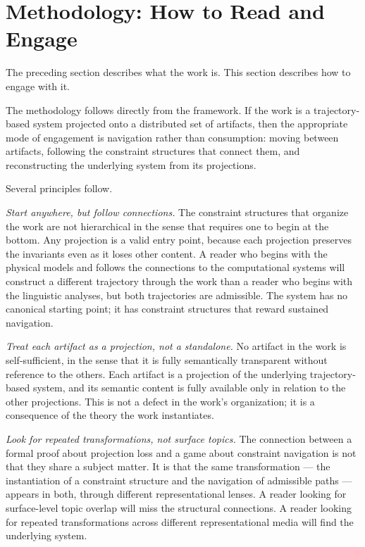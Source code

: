\documentclass[12pt, twoside]{article}
\theoremstyle{plain}
\theoremstyle{definition}
\theoremstyle{remark}
\begin{document}
\section{Methodology: How to Read and Engage}

The preceding section describes what the work is.
This section describes how to engage with it.

The methodology follows directly from the framework.
If the work is a trajectory-based system projected onto
a distributed set of artifacts, then the appropriate mode
of engagement is navigation rather than consumption:
moving between artifacts, following the constraint structures
that connect them, and reconstructing the underlying system
from its projections.

Several principles follow.

\textit{Start anywhere, but follow connections.}
The constraint structures that organize the work are not hierarchical
in the sense that requires one to begin at the bottom.
Any projection is a valid entry point, because each projection
preserves the invariants even as it loses other content.
A reader who begins with the physical models and follows the
connections to the computational systems will construct a different
trajectory through the work than a reader who begins with the
linguistic analyses, but both trajectories are admissible.
The system has no canonical starting point; it has constraint
structures that reward sustained navigation.

\textit{Treat each artifact as a projection, not a standalone.}
No artifact in the work is self-sufficient, in the sense
that it is fully semantically transparent without reference
to the others.
Each artifact is a projection of the underlying trajectory-based
system, and its semantic content is fully available only
in relation to the other projections.
This is not a defect in the work's organization;
it is a consequence of the theory the work instantiates.

\textit{Look for repeated transformations, not surface topics.}
The connection between a formal proof about projection loss
and a game about constraint navigation is not that they share
a subject matter.
It is that the same transformation — the instantiation of
a constraint structure and the navigation of admissible paths —
appears in both, through different representational lenses.
A reader looking for surface-level topic overlap will miss
the structural connections.
A reader looking for repeated transformations across different
representational media will find the underlying system.
\end{document}
